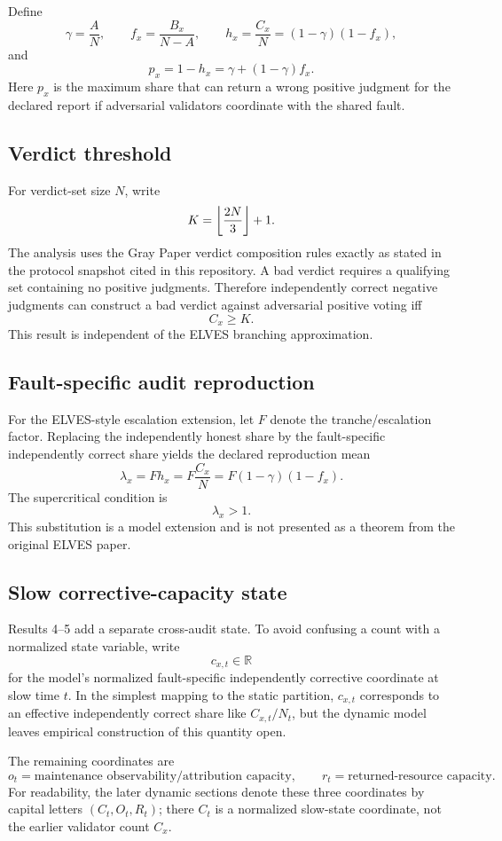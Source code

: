 Define
\[
\gamma=\frac{A}{N},
\qquad
f_x=\frac{B_x}{N-A},
\qquad
h_x=\frac{C_x}{N}=(1-\gamma)(1-f_x),
\]
and
\[
p_x=1-h_x=\gamma+(1-\gamma)f_x.
\]
Here $p_x$ is the maximum share that can return a wrong positive judgment for the declared report if adversarial validators coordinate with the shared fault.

\subsection{Verdict threshold}

For verdict-set size $N$, write
\[
K=\left\lfloor \frac{2N}{3}\right\rfloor+1.
\]
The analysis uses the Gray Paper verdict composition rules exactly as stated in the protocol snapshot cited in this repository. A bad verdict requires a qualifying set containing no positive judgments. Therefore independently correct negative judgments can construct a bad verdict against adversarial positive voting iff
\[
C_x\ge K.
\]
This result is independent of the ELVES branching approximation.

\subsection{Fault-specific audit reproduction}

For the ELVES-style escalation extension, let $F$ denote the tranche/escalation factor. Replacing the independently honest share by the fault-specific independently correct share yields the declared reproduction mean
\[
\lambda_x=Fh_x=F\frac{C_x}{N}=F(1-\gamma)(1-f_x).
\]
The supercritical condition is
\[
\lambda_x>1.
\]
This substitution is a model extension and is not presented as a theorem from the original ELVES paper.

\subsection{Slow corrective-capacity state}

Results 4--5 add a separate cross-audit state. To avoid confusing a count with a normalized state variable, write
\[
c_{x,t}\in\mathbb R
\]
for the model's normalized fault-specific independently corrective coordinate at slow time $t$. In the simplest mapping to the static partition, $c_{x,t}$ corresponds to an effective independently correct share like $C_{x,t}/N_t$, but the dynamic model leaves empirical construction of this quantity open.

The remaining coordinates are
\[
o_t=\text{maintenance observability/attribution capacity},
\qquad
r_t=\text{returned-resource capacity}.
\]
For readability, the later dynamic sections denote these three coordinates by capital letters $(C_t,O_t,R_t)$; there $C_t$ is a normalized slow-state coordinate, not the earlier validator count $C_x$.

